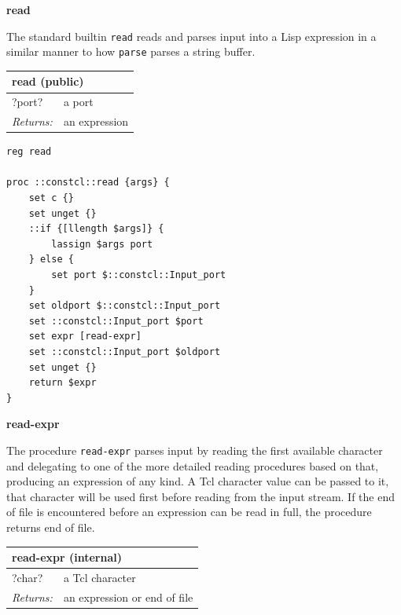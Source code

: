 \documentclass[twoside,9pt]{report}
\begin{document}
\textbf{read}


The standard builtin \texttt{read} reads and parses input into a Lisp expression in a similar manner to how \texttt{parse} parses a string buffer.

\begin{tabular}{ |l l| }
\hline
\multicolumn{2}{|l|}{read (public)} \\
\hline
?port? & a port \\
\textit{Returns:} & an expression \\
\hline
\end{tabular}

\noindent\makebox[\linewidth]{\rule{\linewidth}{0.4pt}}
\begin{lstlisting}
reg read
 
proc ::constcl::read {args} {
    set c {}
    set unget {}
    ::if {[llength $args]} {
        lassign $args port
    } else {
        set port $::constcl::Input_port
    }
    set oldport $::constcl::Input_port
    set ::constcl::Input_port $port
    set expr [read-expr]
    set ::constcl::Input_port $oldport
    set unget {}
    return $expr
}
\end{lstlisting}
\noindent\makebox[\linewidth]{\rule{\linewidth}{0.4pt}}

\textbf{read-expr}


The procedure \texttt{read-expr} parses input by reading the first available character and delegating to one of the more detailed reading procedures based on that, producing an expression of any kind. A Tcl character value can be passed to it, that character will be used first before reading from the input stream. If the end of file is encountered before an expression can be read in full, the procedure returns end of file.

\begin{tabular}{ |l l| }
\hline
\multicolumn{2}{|l|}{read-expr (internal)} \\
\hline
?char? & a Tcl character \\
\textit{Returns:} & an expression or end of file \\
\hline
\end{tabular}
\end{document}
